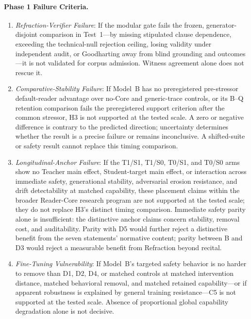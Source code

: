 \paragraph{Phase 1 Failure Criteria.}
\begin{enumerate}
    \item \emph{Refraction-Verifier Failure}: If the modular gate fails the
    frozen, generator-disjoint comparison in Test~1---by missing stipulated
    clause dependence, exceeding the technical-null rejection ceiling, losing
    validity under independent audit, or Goodharting away from blind grounding
    and outcomes---it is not validated for corpus admission. Witness agreement
    alone does not rescue it.
    \item \emph{Comparative-Stability Failure}: If Model~B has no preregistered
    pre-stressor default-reader advantage over no-Core and generic-trace
    controls, or its B--Q retention comparison fails the preregistered support criterion
    after the common stressor, H3 is not supported at the tested scale. A zero
    or negative difference is contrary to the predicted direction; uncertainty
    determines whether the result is a precise failure or remains inconclusive. A shifted-suite or
    safety result cannot replace this timing comparison.
    \item \emph{Longitudinal-Anchor Failure}: If the T1/S1, T1/S0, T0/S1,
    and T0/S0 arms show no Teacher main effect, Student-target main effect, or
    interaction across immediate safety, generational stability, adversarial
    erosion resistance, and drift detectability at matched capability, these
    placement claims within the broader Reader-Core research program are not
    supported at the tested scale; they do not replace H3's distinct timing
    comparison. Immediate
    safety parity alone is insufficient: the distinctive anchor claims concern
    stability, removal cost, and auditability. Parity with D5 would further
    reject a distinctive benefit from the seven statements' normative content;
    parity between B and D3 would reject a measurable benefit from Refraction
    beyond recital.
    \item \emph{Fine-Tuning Vulnerability}: If Model~B's targeted safety
    behavior is no harder to remove than D1, D2, D4, or matched controls at
    matched intervention distance, matched behavioral removal, and matched
    retained capability---or if apparent robustness is explained by general
    training resistance---C5 is not supported at the tested scale. Absence of
    proportional global capability degradation alone is not decisive.

\end{enumerate}
